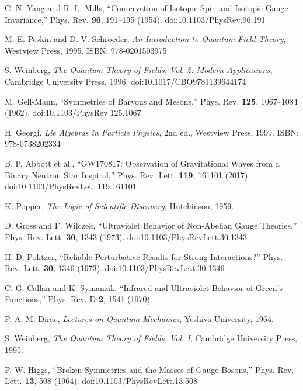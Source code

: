 \documentclass[10pt,reprint,aps,onecolumn,nofootinbib]{revtex4-2}
\begin{document}
\begin{thebibliography}{99}
    C. N. Yang and R. L. Mills,
    ``Conservation of Isotopic Spin and Isotopic Gauge Invariance,''
    Phys. Rev. \textbf{96}, 191--195 (1954).
    doi:10.1103/PhysRev.96.191

    M. E. Peskin and D. V. Schroeder,
    \emph{An Introduction to Quantum Field Theory},
    Westview Press, 1995.
    ISBN: 978-0201503975

    S. Weinberg,
    \emph{The Quantum Theory of Fields, Vol. 2: Modern Applications},
    Cambridge University Press, 1996.
    doi:10.1017/CBO9781139644174

    M. Gell-Mann,
    ``Symmetries of Baryons and Mesons,''
    Phys. Rev. \textbf{125}, 1067--1084 (1962).
    doi:10.1103/PhysRev.125.1067

    H. Georgi,
    \emph{Lie Algebras in Particle Physics}, 2nd ed.,
    Westview Press, 1999.
    ISBN: 978-0738202334

    B. P. Abbott et al.,
    ``GW170817: Observation of Gravitational Waves from a Binary Neutron Star Inspiral,''
    Phys. Rev. Lett. \textbf{119}, 161101 (2017).
    doi:10.1103/PhysRevLett.119.161101

    K. Popper,
    \emph{The Logic of Scientific Discovery},
    Hutchinson, 1959.

    D. Gross and F. Wilczek,
    ``Ultraviolet Behavior of Non-Abelian Gauge Theories,''
    Phys. Rev. Lett. \textbf{30}, 1343 (1973).
    doi:10.1103/PhysRevLett.30.1343

    H. D. Politzer,
    ``Reliable Perturbative Results for Strong Interactions?''
    Phys. Rev. Lett. \textbf{30}, 1346 (1973).
    doi:10.1103/PhysRevLett.30.1346

    C. G. Callan and K. Symanzik,
    ``Infrared and Ultraviolet Behavior of Green's Functions,''
    Phys. Rev. D \textbf{2}, 1541 (1970).

    P. A. M. Dirac,
    \emph{Lectures on Quantum Mechanics},
    Yeshiva University, 1964.

    S. Weinberg,
    \emph{The Quantum Theory of Fields, Vol. I},
    Cambridge University Press, 1995.

    P. W. Higgs,
    ``Broken Symmetries and the Masses of Gauge Bosons,''
    Phys. Rev. Lett. \textbf{13}, 508 (1964).
    doi:10.1103/PhysRevLett.13.508


\end{thebibliography}
\end{document}
